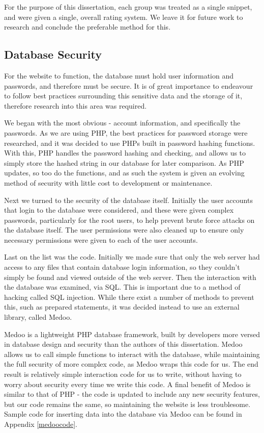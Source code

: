 For the purpose of this dissertation, each group was treated as a single snippet, and were given a single, overall rating system. We leave it for future work to research and conclude the preferable method for this.

\subsection{Database Security} \label{DBSec}
For the website to function, the database must hold user information and passwords, and therefore must be secure.
It is of great importance to endeavour to follow best practices surrounding this sensitive data and the storage of it, therefore research into this area was required.

We began with the most obvious - account information, and specifically the passwords. 
As we are using PHP, the best practices for password storage were researched, and it was decided to use PHPs built in password hashing functions. 
With this, PHP handles the password hashing and checking, and allows us to simply store the hashed string in our database for later comparison.
As PHP updates, so too do the functions, and as such the system is given an evolving method of security with little cost to development or maintenance.

Next we turned to the security of the database itself. 
Initially the user accounts that login to the database were considered, and these were given complex passwords, particularly for the root users, to help prevent brute force attacks on the database itself.
The user permissions were also cleaned up to ensure only necessary permissions were given to each of the user accounts.

Last on the list was the code. 
Initially we made sure that only the web server had access to any files that contain database login information, so they couldn't simply be found and viewed outside of the web server. 
Then the interaction with the database was examined, via SQL.
This is important due to a method of hacking called SQL injection.
While there exist a number of methods to prevent this, such as prepared statements, it was decided instead to use an external library, called Medoo.

Medoo is a lightweight PHP database framework, built by developers more versed in database design and security than the authors of this dissertation.
Medoo allows us to call simple functions to interact with the database, while maintaining the full security of more complex code, as Medoo wraps this code for us.
The end result is relatively simple interaction code for us to write, without having to worry about security every time we write this code.
A final benefit of Medoo is similar to that of PHP - the code is updated to include any new security features, but our code remains the same, so maintaining the website is less troublesome.
Sample code for inserting data into the database via Medoo can be found in Appendix \ref{medoocode}.


